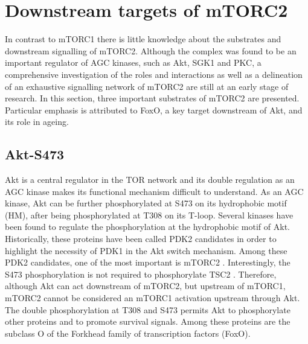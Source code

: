 \section{Downstream targets of mTORC2}
\label{sec:Downstream targets of mTORC2}
In contrast to mTORC1 there is little knowledge about the substrates and downstream signalling of mTORC2. Although the complex was found to be an important regulator of AGC kinases, such as Akt, SGK1 and PKC, a comprehensive investigation of the roles and interactions as well as a delineation of an exhaustive signalling network of mTORC2 are still at an early stage of research. In this section, three important substrates of mTORC2 are presented. Particular emphasis is attributed to FoxO, a key target downstream of Akt, and its role in ageing.

\subsection{Akt-S473}
\label{subsec:Akt-S473}
Akt is a central regulator in the TOR network and its double regulation as an AGC kinase makes its functional mechanism difficult to understand. As an AGC kinase, Akt can be further phosphorylated at S473 on its hydrophobic motif (HM), after being phosphorylated at T308 on its T-loop. Several kinases have been found to regulate the phosphorylation at the hydrophobic motif of Akt. Historically, these proteins have been called PDK2 candidates in order to highlight the necessity of PDK1 in the Akt switch mechanism. Among these PDK2 candidates, one of the most important is mTORC2 \citep{Sarbassov2005, Sarbassov2006, Copp2009}. Interestingly, the S473 phosphorylation is not required to phosphorylate TSC2 \citep{Jacinto2006}. Therefore, although Akt can act downstream of mTORC2, but upstream of mTORC1, mTORC2 cannot be considered an mTORC1 activation upstream through Akt. The double phosphorylation at T308 and S473 permits Akt to phosphorylate other proteins and to promote survival signals. Among these proteins 
are the subclass O of the Forkhead family of transcription factors (FoxO).


